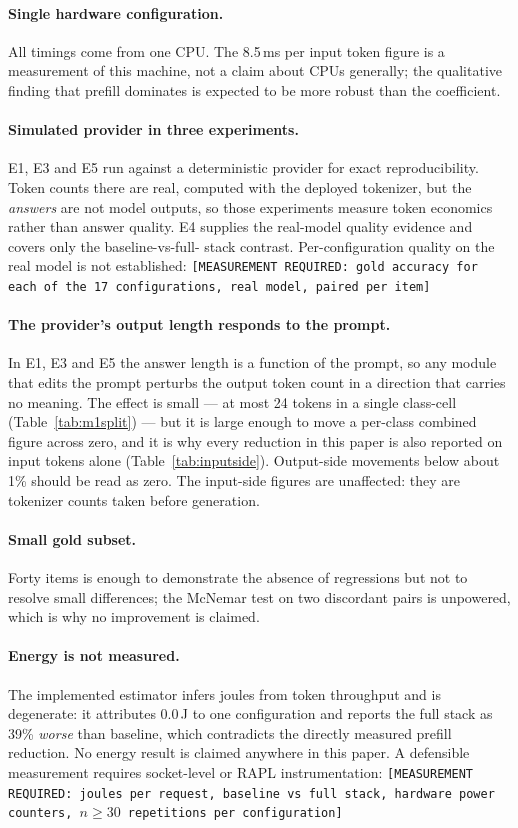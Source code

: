 \documentclass[11pt,a4paper]{article}
\newcommand{\todoval}[1]{\textcolor{accent}{\small\texttt{[MEASUREMENT REQUIRED: #1]}}}
\begin{document}
\paragraph{Single hardware configuration.} All timings come from one CPU. The
8.5\,ms per input token figure is a measurement of this machine, not a claim
about CPUs generally; the qualitative finding that prefill dominates is expected
to be more robust than the coefficient.

\paragraph{Simulated provider in three experiments.} E1, E3 and E5 run against a
deterministic provider for exact reproducibility. Token counts there are real,
computed with the deployed tokenizer, but the \emph{answers} are not model
outputs, so those experiments measure token economics rather than answer quality.
E4 supplies the real-model quality evidence and covers only the baseline-vs-full-
stack contrast. Per-configuration quality on the real model is not established:
\todoval{gold accuracy for each of the 17 configurations, real model, paired per
item}

\paragraph{The provider's output length responds to the prompt.} In E1, E3 and E5
the answer length is a function of the prompt, so any module that edits the
prompt perturbs the output token count in a direction that carries no meaning.
The effect is small --- at most 24 tokens in a single class-cell
(Table~\ref{tab:m1split}) --- but it is large enough to move a per-class combined
figure across zero, and it is why every reduction in this paper is also reported
on input tokens alone (Table~\ref{tab:inputside}). Output-side movements below
about 1\% should be read as zero. The input-side figures are unaffected: they are
tokenizer counts taken before generation.

\paragraph{Small gold subset.} Forty items is enough to demonstrate the absence of
regressions but not to resolve small differences; the McNemar test on two
discordant pairs is unpowered, which is why no improvement is claimed.

\paragraph{Energy is not measured.} The implemented estimator infers joules from
token throughput and is degenerate: it attributes 0.0\,J to one configuration and
reports the full stack as 39\% \emph{worse} than baseline, which contradicts the
directly measured prefill reduction. No energy result is claimed anywhere in this
paper. A defensible measurement requires socket-level or RAPL instrumentation:
\todoval{joules per request, baseline vs full stack, hardware power counters,
$n \geq 30$ repetitions per configuration}
\end{document}
